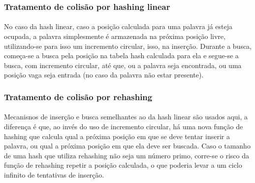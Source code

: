\documentclass[12pt,a4paper]{article}
\begin{document}
   \subsubsection{Tratamento de colisão por hashing linear}
    {\paragraph{} No caso da hash linear, caso a posição calculada para uma palavra já esteja ocupada, a palavra simplesmente é
    armazenada na próxima posição livre, utilizando-se para isso um incremento circular, isso, na inserção. Durante a busca, começa-se
    a busca pela posição na tabela hash calculada para ela e segue-se a busca, com incremento circular, até que, ou a palavra seja
    encontrada, ou uma posição vaga seja entrada (no caso da palavra não estar presente). }
    
   \subsubsection{Tratamento de colisão por rehashing}
    {\paragraph{} Mecanisnos de inserção e busca semelhantes ao da hash linear são usados aqui, a diferença é que, ao invés do uso
    de incremento circular, há uma nova função de hashing que calcula qual a próxima posição em que se deve tentar inserir a palavra,
    ou qual a próxima posição em que ela deve ser buscada. Caso o tamanho de uma hash que utiliza rehashing não seja um número primo,
    corre-se o risco da função de rehashing repetir a posição calculada, o que poderia levar a um ciclo infinito de tentativas de inserção.}
    
\end{document}
